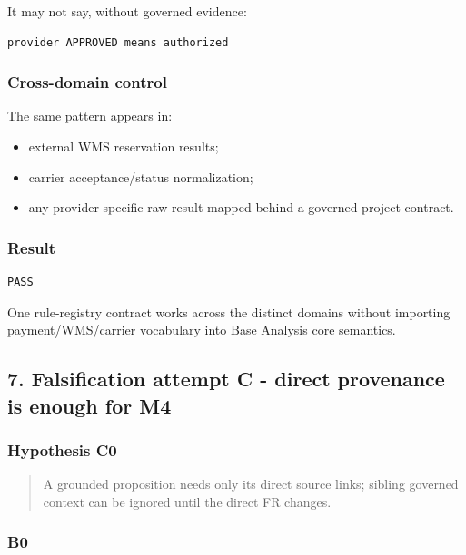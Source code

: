 \documentclass[11pt,a4paper]{article}
\providecommand{\tightlist}{\setlength{\itemsep}{0pt}\setlength{\parskip}{0pt}}
\begin{document}
It may not say, without governed evidence:

\begin{verbatim}
provider APPROVED means authorized
\end{verbatim}

\subsubsection{Cross-domain control}\label{cross-domain-control}

The same pattern appears in:

\begin{itemize}
\tightlist
\item
  external WMS reservation results;
\item
  carrier acceptance/status normalization;
\item
  any provider-specific raw result mapped behind a governed project
  contract.
\end{itemize}

\subsubsection{Result}\label{result-2}

\begin{verbatim}
PASS
\end{verbatim}

One rule-registry contract works across the distinct domains without
importing payment/WMS/carrier vocabulary into Base Analysis core
semantics.

\subsection{7. Falsification attempt C - direct provenance is enough for
M4}\label{falsification-attempt-c---direct-provenance-is-enough-for-m4}

\subsubsection{Hypothesis C0}\label{hypothesis-c0}

\begin{quote}
A grounded proposition needs only its direct source links; sibling
governed context can be ignored until the direct FR changes.
\end{quote}

\subsubsection{B0}\label{b0}
\end{document}
